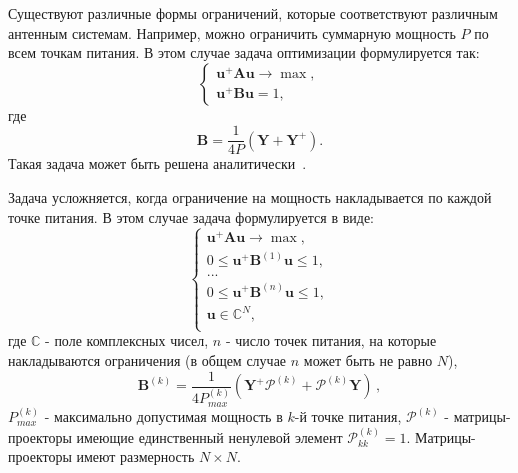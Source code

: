 Существуют различные формы ограничений, которые соответствуют различным антенным системам. Например, можно ограничить суммарную мощность $P$ по всем точкам питания. В этом случае задача оптимизации формулируется так:
%
     \begin{equation}
        \begin{cases}
           \textbf{u}^{+}\textbf{Au} \rightarrow \max,\\
           \textbf{u}^{+}\textbf{Bu} = 1,
         \end{cases}
         \label{eq:task1}
    \end{equation}
%
где
%
    \begin{equation}
        \textbf{B} = \frac{1}{4P}(\textbf{Y} + \textbf{Y}^{+}).
        \label{eq:B}
    \end{equation}
%
Такая задача может быть решена аналитически~\cite{yurkov:farkv}.

Задача усложняется, когда ограничение на мощность накладывается по каждой точке питания. В этом случае задача формулируется в виде:
%
    \begin{equation}
        \begin{cases}
           \textbf{u}^{+}\textbf{Au} \rightarrow \max,\\
           0 \leq \textbf{u}^{+}\textbf{B}^{(1)}\textbf{u} \leq 1, \\
           ...\\
           0 \leq \textbf{u}^{+}\textbf{B}^{(n)}\textbf{u} \leq 1,\\
           \textbf{u} \in \mathbb{C}^N,\\
         \end{cases}
         \label{eq:task2}
    \end{equation}
%
где $\mathbb{C}$ - поле комплексных чисел, $n$ - число точек питания, на которые накладываются ограничения (в общем случае $n$ может быть не равно $N$),
%
    \begin{equation}
        \textbf{B}^{(k)} = \frac{1}{4P_{max}^{(k)}}(\textbf{Y}^{+}\mathcal{P}^{(k)} + \mathcal{P}^{(k)}\textbf{Y}) \, ,
    \end{equation}
%
$P_{max}^{(k)}$ - максимально допустимая мощность в $k$-й точке питания, $\mathcal{P}^{(k)}$ - матрицы-проекторы имеющие единственный ненулевой элемент $\mathcal{P}^{(k)}_{kk}=1$. Матрицы-проекторы имеют размерность $N \times N$.

